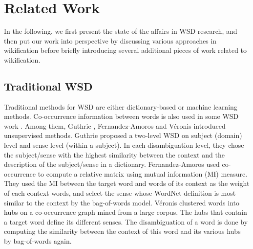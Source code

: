 \section{Related Work}
\label{sec:related}

In the following, we first present the state of the affairs in WSD research,
and then put our work into perspective by discussing
various approaches in wikification before briefly introducing several
additional pieces of work related to wikification.

\subsection{Traditional WSD}
Traditional methods for WSD are either dictionary-based
or machine learning methods. Co-occurrence information
between words is also used in some WSD work \cite{GuthrieGWA91,Li1998:wcd,ChungKML01,Stokoe2003:WSD,Fernandez-AmorosGSS10,Veronis04:Hyperlex}.
Among them, Guthrie \cite{GuthrieGWA91},
Fernandez-Amoros \cite{Fernandez-AmorosGSS10} and
V\'{e}ronis \cite{Veronis04:Hyperlex} introduced unsupervised methods.
Guthrie \cite{GuthrieGWA91} proposed a two-level WSD on subject (domain) level
and sense level (within a subject). In each
disambiguation level, they chose the subject/sense with the highest similarity
between the context and the description of the subject/sense in a dictionary.
Fernandez-Amoros \cite{Fernandez-AmorosGSS10} used co-occurrence to compute a
relative matrix using mutual information (MI) measure.
They used the MI between the target word and words of its context as the
weight of each context words, and select the sense whose WordNet
definition is most
similar to the context by the bag-of-words model.
V\'{e}ronis \cite{Veronis04:Hyperlex}
clustered words into hubs on a co-occurrence graph mined from a large corpus.
The hubs that contain a target word define its different senses.
The disambiguation of a word is done by computing the similarity between the context
of this word and its various hubs by bag-of-words again.

